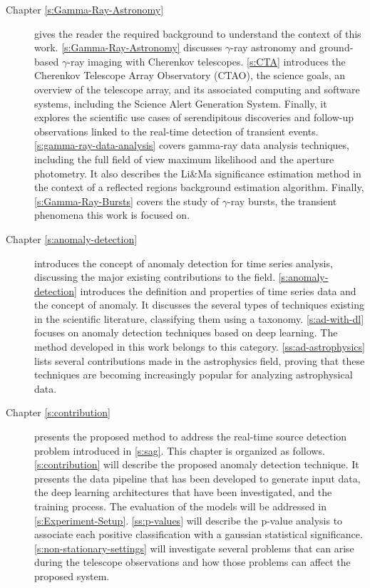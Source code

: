 \begin{description}

  \item[Chapter \ref{s:Gamma-Ray-Astronomy}] gives the reader the required background to understand the context of this work. \autoref{s:Gamma-Ray-Astronomy} discusses $\gamma$-ray astronomy and ground-based $\gamma$-ray imaging with Cherenkov telescopes. \autoref{s:CTA} introduces the Cherenkov Telescope Array Observatory (CTAO), the science goals, an overview of the telescope array, and its associated computing and software systems, including the Science Alert Generation System. Finally, it explores the scientific use cases of serendipitous discoveries and follow-up observations linked to the real-time detection of transient events. \autoref{s:gamma-ray-data-analysis} covers gamma-ray data analysis techniques, including the full field of view maximum likelihood and the aperture photometry. It also describes the Li\&Ma significance estimation method in the context of a reflected regions background estimation algorithm. Finally, \autoref{s:Gamma-Ray-Bursts} covers the study of $\gamma$-ray bursts, the transient phenomena this work is focused on.
  
  \item[Chapter \ref{s:anomaly-detection}] introduces the concept of anomaly detection for time series analysis, discussing the major existing contributions to the field. \autoref{s:anomaly-detection} introduces the definition and properties of time series data and the concept of anomaly. It discusses the several types of techniques existing in the scientific literature, classifying them using a taxonomy. \autoref{s:ad-with-dl} focuses on anomaly detection techniques based on deep learning. The method developed in this work belongs to this category. \autoref{ss:ad-astrophysics} lists several contributions made in the astrophysics field, proving that these techniques are becoming increasingly popular for analyzing astrophysical data.


  \item[Chapter \ref{s:contribution}] presents the proposed method to address the real-time source detection problem introduced in \autoref{s:sag}. This chapter is organized as follows. \autoref{s:contribution} will describe the proposed anomaly detection technique. It presents the data pipeline that has been developed to generate input data, the deep learning architectures that have been investigated, and the training process. The evaluation of the models will be addressed in \autoref{s:Experiment-Setup}. \autoref{ss:p-values} will describe the p-value analysis to associate each positive classification with a gaussian statistical significance. \autoref{s:non-stationary-settings} will investigate several problems that can arise during the telescope observations and how those problems can affect the proposed system.

\end{description}



